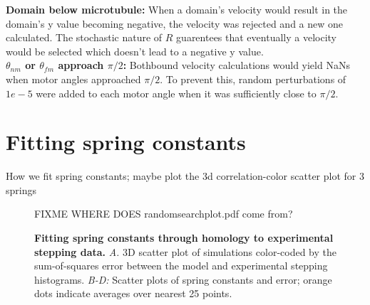 \documentclass[9pt,twoside,lineno]{pnas-new}
\begin{document}
\textbf{Domain below microtubule:} When a domain's velocity would result in the domain's y value becoming negative, the velocity was rejected and a new one calculated. The stochastic nature of $R$ guarentees that eventually a velocity would be selected which doesn't lead to a negative y value.\\

\textbf{$\theta_{nm}$ or $\theta_{fm}$ approach $\pi/2$:} Bothbound velocity calculations would yield NaNs when motor angles approached $\pi/2$. To prevent this, random perturbations of $1e-5$ were added to each motor angle when it was sufficiently close to $\pi/2$.

\section*{Fitting spring constants}
How we fit spring constants; maybe plot the 3d correlation-color scatter plot for 3 springs

\begin{figure}[tbhp]
\centering
FIXME WHERE DOES randomsearchplot.pdf come from?
\caption{\textbf{Fitting spring constants through homology to experimental stepping data.} \textit{A.} 3D scatter plot of simulations color-coded by the sum-of-squares error between the model and experimental stepping histograms. \textit{B-D:} Scatter plots of spring constants and error; orange dots indicate averages over nearest 25 points.}
\label{fig:supp-model}
\end{figure}





\end{document}
